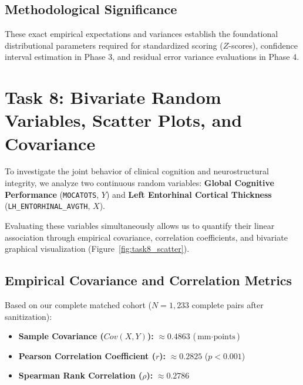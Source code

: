\documentclass[11pt, a4paper]{article}
\begin{document}
\subsection{Methodological Significance}
These exact empirical expectations and variances establish the foundational distributional parameters required for standardized scoring ($Z$-scores), confidence interval estimation in Phase 3, and residual error variance evaluations in Phase 4.

\section{Task 8: Bivariate Random Variables, Scatter Plots, and Covariance}
To investigate the joint behavior of clinical cognition and neurostructural integrity, we analyze two continuous random variables: \textbf{Global Cognitive Performance} (\texttt{MOCATOTS}, $Y$) and \textbf{Left Entorhinal Cortical Thickness} (\texttt{LH\_ENTORHINAL\_AVGTH}, $X$).

Evaluating these variables simultaneously allows us to quantify their linear association through empirical covariance, correlation coefficients, and bivariate graphical visualization (Figure~\ref{fig:task8_scatter}).

\subsection{Empirical Covariance and Correlation Metrics}
Based on our complete matched cohort ($N = 1,233$ complete pairs after sanitization):
\begin{itemize}
    \item \textbf{Sample Covariance ($Cov(X, Y)$):} $\approx 0.4863$ ($\text{mm} \cdot \text{points}$)
    \item \textbf{Pearson Correlation Coefficient ($r$):} $\approx 0.2825$ ($p < 0.001$)
    \item \textbf{Spearman Rank Correlation ($\rho$):} $\approx 0.2786$
\end{itemize}
\end{document}
